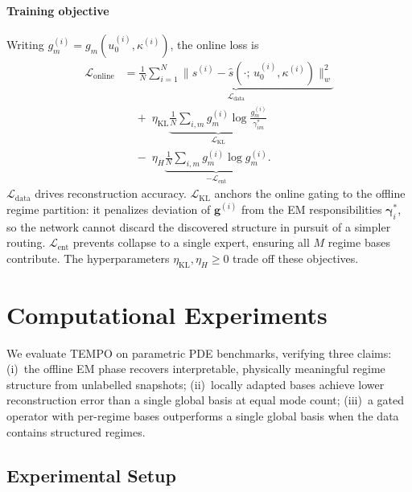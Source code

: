 \documentclass[preprint,10pt]{elsarticle}
\begin{document}
\paragraph{Training objective}
Writing $g_m^{(i)} = g_m(u_0^{(i)},\kappa^{(i)})$, the online loss is
\begin{equation}
\begin{split}
  \mathcal{L}_{\mathrm{online}}
  &= \underbrace{
      \frac{1}{N}\sum_{i=1}^{N}
      \|s^{(i)} - \hat{s}(\cdot;\,u_0^{(i)},\kappa^{(i)})\|_w^2
    }_{\mathcal{L}_{\mathrm{data}}} \\
  &\quad +\;\eta_{\mathrm{KL}}
    \underbrace{
      \frac{1}{N}\sum_{i,m}
      g_m^{(i)}\log\frac{g_m^{(i)}}{\gamma_{im}^*}
    }_{\mathcal{L}_{\mathrm{KL}}} \\
  &\quad -\;\eta_{H}
    \underbrace{
      \frac{1}{N}\sum_{i,m}
      g_m^{(i)}\log g_m^{(i)}
    }_{-\mathcal{L}_{\mathrm{ent}}}.
\end{split}
  \label{eq:online_loss}
\end{equation}
$\mathcal{L}_{\mathrm{data}}$ drives reconstruction accuracy.
$\mathcal{L}_{\mathrm{KL}}$ anchors the online gating to the
offline regime partition: it penalizes deviation of $\mathbf{g}^{(i)}$
from the EM responsibilities $\boldsymbol{\gamma}_i^*$, so the
network cannot discard the discovered structure in pursuit of a
simpler routing.
$\mathcal{L}_{\mathrm{ent}}$ prevents collapse to a single expert,
ensuring all $M$ regime bases contribute.
The hyperparameters $\eta_{\mathrm{KL}}, \eta_H \ge 0$ trade
off these objectives.






\section{Computational Experiments}
\label{sec:exp}

We evaluate TEMPO on parametric PDE benchmarks, verifying three claims:
(i)~the offline EM phase recovers interpretable, physically meaningful regime
structure from unlabelled snapshots;
(ii)~locally adapted bases achieve lower reconstruction error than a
single global basis at equal mode count;
(iii)~a gated operator with per-regime bases outperforms a single global basis when the data contains structured regimes.

\subsection{Experimental Setup}
\label{sec:setup}
\end{document}
